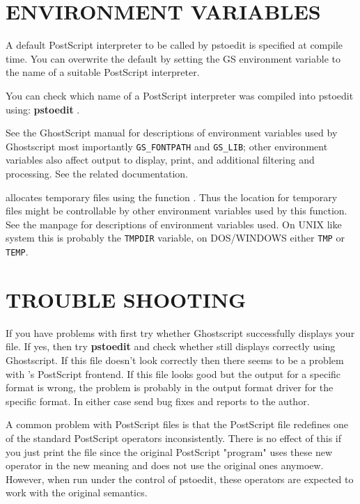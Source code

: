 \documentclass[english,a4paper]{article}
\begin{document}
\section{ENVIRONMENT VARIABLES}

A default PostScript interpreter to be called by pstoedit is specified at
compile time. You can overwrite the default by setting the GS environment
variable to the name of a suitable PostScript interpreter.

You can check which name of a PostScript interpreter was compiled into
pstoedit using: \textbf{pstoedit} .

See the GhostScript manual for descriptions of environment variables used by
Ghostscript most importantly \verb+GS_FONTPATH+ and \verb+GS_LIB+; other
environment variables also affect output to display, print, and additional
filtering and processing. See the related documentation.

 allocates temporary files using the function .
Thus the location for temporary files might be controllable by other
environment variables used by this function. See the  manpage
for descriptions of environment variables used. On UNIX like system this is
probably the \verb+TMPDIR+ variable, on DOS/WINDOWS either \verb+TMP+ or
\verb+TEMP+.

\section{TROUBLE SHOOTING}

If you have problems with  first try whether Ghostscript
successfully displays your file. If yes, then try 
\textbf{pstoedit}    
and check whether  still displays correctly using
Ghostscript. If this file doesn't look correctly then there seems to be a
problem with 's PostScript frontend. If this file looks good
but the output for a specific format is wrong, the problem is probably in
the output format driver for the specific format. In either case send bug fixes and
reports to the author.

A common problem with PostScript files is that the PostScript file redefines
one of the standard PostScript operators inconsistently. There is no effect
of this if you just print the file since the original PostScript "program"
uses these new operator in the new meaning and does not use the original
ones anymoew. However, when run under the control of pstoedit, these
operators are expected to work with the original semantics.
\end{document}
